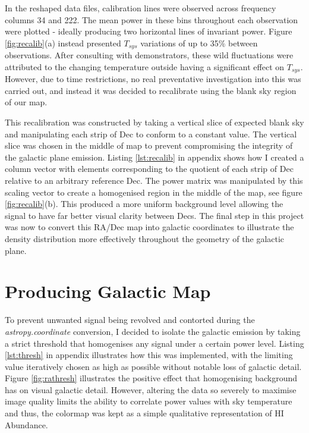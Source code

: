 \documentclass[11pt]{article} %
\begin{document}
%


In the reshaped data files, calibration lines were observed across frequency columns 34 and 222. The mean power in these bins throughout each observation were plotted - ideally producing two horizontal lines of invariant power. Figure \ref{fig:recalib}(a) instead presented $T_{sys}$ variations of up to 35\% between observations. After consulting with demonstrators, these wild fluctuations were attributed to the changing temperature outside having a significant effect on $T_{sys}$. However, due to time restrictions, no real preventative investigation into this was carried out, and instead it was decided to recalibrate using the blank sky region of our map.

This recalibration was constructed by taking a vertical slice of expected blank sky and manipulating each strip of Dec to conform to a constant value. The vertical slice was chosen in the middle of map to prevent compromising the integrity of the galactic plane emission. Listing \ref{lst:recalib} in appendix shows how I created a column vector with elements corresponding to the quotient of each strip of Dec relative to an arbitrary reference Dec. The power matrix was manipulated by this scaling vector to create a homogenised region in the middle of the map, see figure \ref{fig:recalib}(b). This produced a more uniform background level allowing the signal to have far better visual clarity between Decs. The final step in this project was now to convert this RA/Dec map into galactic coordinates to illustrate the density distribution more effectively throughout the geometry of the galactic plane.

\section{Producing Galactic Map} \label{gal map}

To prevent unwanted signal being revolved and contorted during the \textit{astropy.coordinate} conversion, I decided to isolate the galactic emission by taking a strict threshold that homogenises any signal under a certain power level. Listing \ref{lst:thresh} in appendix illustrates how this was implemented, with the limiting value iteratively chosen as high as possible without notable loss of galactic detail. Figure \ref{fig:rathresh} illustrates the positive effect that homogenising background has on visual galactic detail. However, altering the data so severely to maximise image quality limits the ability to correlate power values with sky temperature and thus, the colormap was kept as a simple qualitative representation of HI Abundance.
\end{document}
